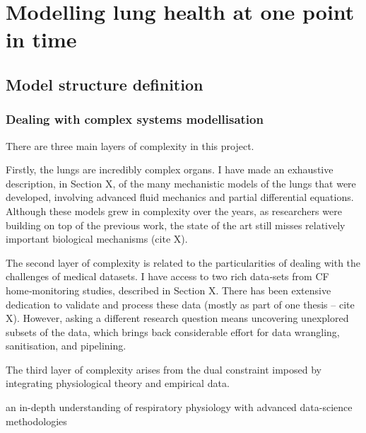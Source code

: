 
\chapter{Modelling lung health at one point in time}  %

\ifpdf
    \graphicspath{{Chapter1/Figs/Raster/}{Chapter1/Figs/PDF/}{Chapter1/Figs/}}
\else
    \graphicspath{{Chapter1/Figs/Vector/}{Chapter1/Figs/}}
\fi

\section{Model structure definition}

\subsection{Dealing with complex systems modellisation}

There are three main layers of complexity in this project.

Firstly, the lungs are incredibly complex organs. I have made an exhaustive description, in Section X, of the many mechanistic models of the lungs that were developed, involving advanced fluid mechanics and partial differential equations. Although these models grew in complexity over the years, as researchers were building on top of the previous work, the state of the art still misses relatively important biological mechanisms (cite X).

The second layer of complexity is related to the particularities of dealing with the challenges of medical datasets. I have access to two rich data‑sets from CF home‑monitoring studies, described in Section X. There has been extensive dedication to validate and process these data (mostly as part of one thesis – cite X). However, asking a different research question means uncovering unexplored subsets of the data, which brings back considerable effort for data wrangling, sanitisation, and pipelining.

The third layer of complexity arises from the dual constraint imposed by integrating physiological theory and empirical data. 

an in-depth understanding of respiratory physiology with advanced data-science methodologies

